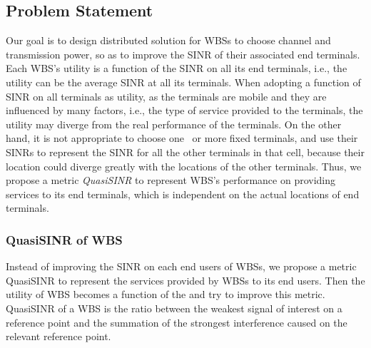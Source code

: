 \documentclass[times]{ettauth}
\newcommand{\ie}{i.e., }
\theoremstyle{mytheoremstyle}
\theoremstyle{mytheoremstyle}
\theoremstyle{mytheoremstyle}
\begin{document}
\subsection{Problem Statement}
Our goal is to design distributed solution for WBSs to choose channel and transmission power, so as to improve the SINR of their associated end terminals.
Each WBS's utility is a function of the SINR on all its end terminals, \ie the utility can be the average SINR at all its terminals.
When adopting a function of SINR on all terminals as utility, as the terminals are mobile and they are influenced by many factors, \ie the type of service provided to the terminals, the utility may diverge from the real performance of the terminals.
On the other hand, it is not appropriate to choose one~\cite{spectrum_sharing_tvspace_2012} or more fixed terminals, and use their SINRs to represent the SINR for all the other terminals in that cell, because their location could diverge greatly with the locations of the other terminals.
Thus, we propose a metric \textit{QuasiSINR} to represent WBS's performance on providing services to its end terminals, which is independent on the actual locations of end terminals.



\subsubsection*{QuasiSINR of WBS}

Instead of improving the SINR on each end users of WBSs, we propose a metric QuasiSINR to represent the services provided by WBSs to its end users.
Then the utility of WBS becomes a function of the  and try to improve this metric.
QuasiSINR of a WBS is the ratio between the weakest signal of interest on a reference point and the summation of the strongest interference caused on the relevant reference point.
\end{document}

